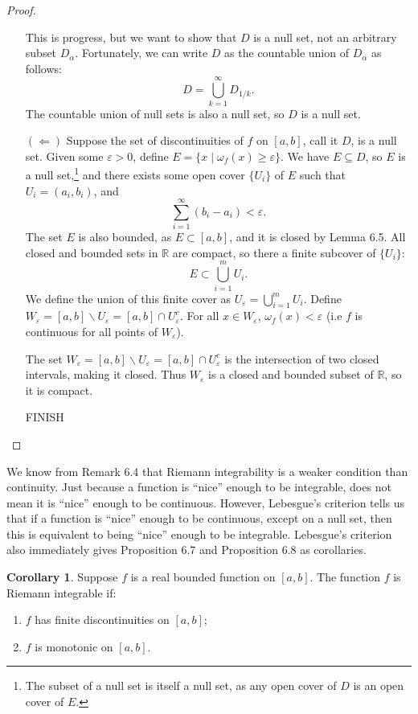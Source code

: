 \documentclass{article}
\newcommand{\R}{\mathbb{R}}
\theoremstyle{definition}
\newtheorem{corollary}{Corollary}[section]
\begin{document}
\begin{proof}
\begin{enumerate}
			This is progress, but we want to show that $ D $ is a null set, not an arbitrary subset $ D_\alpha $. Fortunately, we can write $ D $ as the countable union of $ D_\alpha $ as follows: 
			$$ D = \bigcup_{k=1}^\infty D_{1/k}.$$ The countable union of null sets is also a null set, so $ D $ is a null set. 
			\item [$ (\Longleftarrow) $] Suppose the set of discontinuities of $ f $ on $ [a,b] $, call it $ D $, is a null set. Given some $ \varepsilon >0 $, define $ E=\{x\mid\omega_f(x)\ge \varepsilon\} $. We have $ E\subseteq D $, so $ E $ is a null set,\footnote{The subset of a null set is itself a null set, as any open cover of $ D $ is an open cover of $ E $.} and there exists some open cover $ \{U_i\} $ of $ E $ such that $ U_i=(a_i,b_i)$, and 
			$$ \sum_{i=1}^{\infty}(b_i-a_i) < \varepsilon.$$The set $ E $ is also bounded, as $ E\subset [a,b] $, and it is closed by Lemma 6.5. All closed and bounded sets in $ \R $ are compact, so there a finite subcover of $ \{U_i\} $: 
			$$ E\subset \bigcup_{i=1}^m U_i. $$
			We define the union of this finite cover as $ U_\varepsilon =\bigcup_{i=1}^m U_i $. Define $ W_\varepsilon =[a,b]\backslash U_\varepsilon = [a,b]\cap U_\varepsilon^c $. For all $ x\in W_\varepsilon $, $ \omega_f(x)<\varepsilon $ (i.e $ f $ is continuous for all points of $ W_\varepsilon $).			
			
			
			The set $ W_\varepsilon =[a,b]\backslash U_\varepsilon = [a,b]\cap U_\varepsilon^c $ is the intersection of two closed intervals, making it closed. Thus $ W_\varepsilon $ is a closed and bounded subset of $ \R $, so it is compact. 
			
			{\color{red}FINISH}
		\end{enumerate}
	\end{proof}
	We know from Remark 6.4 that Riemann integrability is a weaker condition than continuity. Just because a function is ``nice'' enough to be integrable, does not mean it is ``nice'' enough to be continuous. However, Lebesgue's criterion tells us that if a function is ``nice'' enough to be continuous, except on a null set, then this is equivalent to being ``nice'' enough to be integrable.  Lebesgue's criterion also immediately gives Proposition 6.7 and Proposition 6.8 as corollaries. 
	\begin{corollary}
		Suppose $ f $ is a real bounded  function on $ [a,b] $. The function $ f $ is Riemann integrable if:
		\begin{enumerate}
			\item $ f $ has finite discontinuities on $ [a,b] $;
			\item $ f $ is monotonic on $ [a,b] $.
		\end{enumerate}
	\end{corollary}
\end{document}
